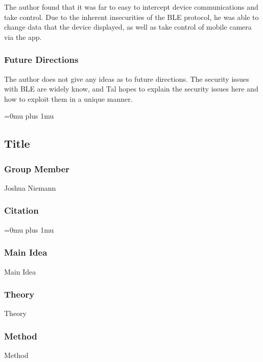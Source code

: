 \noindent
The author found that it was far to easy to intercept device communications and take control. Due to the inherent insecurities of the BLE protocol, he was able to change data that the device displayed, as well as take control of mobile camera via the app. 

\subsubsection{Future Directions}

\noindent
The author does not give any ideas as to future directions. The security issues with BLE are widely know, and Tal hopes to explain the security issues here and how to exploit them in a unique manner. 

\Urlmuskip=0mu plus 1mu\relax

\noindent
\subsection{Title}

\subsubsection{Group Member}

\noindent
Joshua Niemann

\noindent
\subsubsection{Citation}

\Urlmuskip=0mu plus 1mu\relax

\subsubsection{Main Idea}

\noindent
Main Idea

\subsubsection{Theory}

\noindent
Theory

\subsubsection{Method}

\noindent
Method

